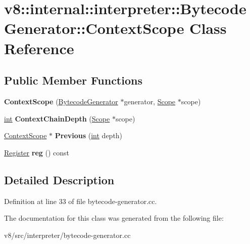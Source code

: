 \hypertarget{classv8_1_1internal_1_1interpreter_1_1BytecodeGenerator_1_1ContextScope}{}\section{v8\+:\+:internal\+:\+:interpreter\+:\+:Bytecode\+Generator\+:\+:Context\+Scope Class Reference}
\label{classv8_1_1internal_1_1interpreter_1_1BytecodeGenerator_1_1ContextScope}
\subsection*{Public Member Functions}
\begin{DoxyCompactItemize}
\item 
\mbox{\label{classv8_1_1internal_1_1interpreter_1_1BytecodeGenerator_1_1ContextScope_a5f830abc4c80e2f0fe3460125d529279}} 
{\bfseries Context\+Scope} (\mbox{\hyperlink{classv8_1_1internal_1_1interpreter_1_1BytecodeGenerator}{Bytecode\+Generator}} $\ast$generator, \mbox{\hyperlink{classv8_1_1internal_1_1Scope}{Scope}} $\ast$scope)
\item 
\mbox{\label{classv8_1_1internal_1_1interpreter_1_1BytecodeGenerator_1_1ContextScope_aa82e4cb619d20538127cc82db2c1cc21}} 
\mbox{\hyperlink{classint}{int}} {\bfseries Context\+Chain\+Depth} (\mbox{\hyperlink{classv8_1_1internal_1_1Scope}{Scope}} $\ast$scope)
\item 
\mbox{\label{classv8_1_1internal_1_1interpreter_1_1BytecodeGenerator_1_1ContextScope_ac25bcb780e54eb0ad1783b812017cea1}} 
\mbox{\hyperlink{classv8_1_1internal_1_1interpreter_1_1BytecodeGenerator_1_1ContextScope}{Context\+Scope}} $\ast$ {\bfseries Previous} (\mbox{\hyperlink{classint}{int}} depth)
\item 
\mbox{\label{classv8_1_1internal_1_1interpreter_1_1BytecodeGenerator_1_1ContextScope_ada15f8318a610979bbb4a5de467424a0}} 
\mbox{\hyperlink{classv8_1_1internal_1_1interpreter_1_1Register}{Register}} {\bfseries reg} () const
\end{DoxyCompactItemize}


\subsection{Detailed Description}


Definition at line 33 of file bytecode-\/generator.\+cc.



The documentation for this class was generated from the following file\+:\begin{DoxyCompactItemize}
\item 
v8/src/interpreter/bytecode-\/generator.\+cc\end{DoxyCompactItemize}
